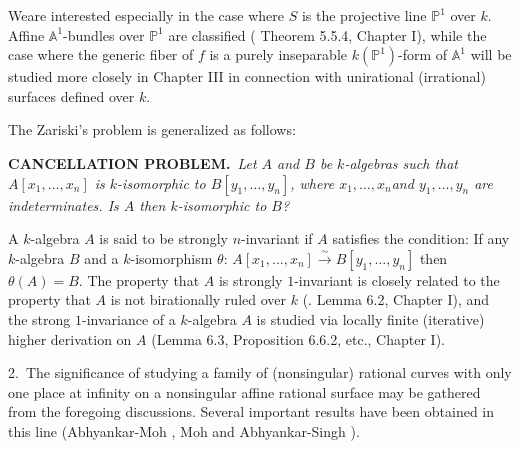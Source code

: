 We\pageoriginale are interested especially in the case where $S$ is
the projective line $\mathbb{P}^{1}$ over $k$. Affine
$\mathbb{A}^{1}$-bundles over $\mathbb{P}^{1}$ are classified (\cf
Theorem 5.5.4, Chapter I), while the case where the generic fiber of
$f$ is a purely inseparable $k(\mathbb{P}^{1})$-form of
$\mathbb{A}^{1}$ will be studied more closely in Chapter III in
connection with unirational (irrational) surfaces defined over $k$.

The Zariski's problem is generalized as follows:

\medskip
\noindent
{\bf CANCELLATION PROBLEM.}~{\em Let $A$ and $B$ be $k$-algebras such
  that $A[x_{1},\ldots,x_{n}]$ is $k$-isomorphic to
  $B[y_{1},\ldots,y_{n}]$, where $x_{1},\ldots, x_{n}$\break  and
  $y_{1},\ldots,y_{n}$ are indeterminates. Is $A$ then $k$-isomorphic
  to $B$?}
\medskip

A $k$-algebra $A$ is said to be strongly $n$-invariant if $A$
satisfies the condition: If any $k$-algebra $B$ and a $k$-isomorphism
$\theta$:
$A[x_{1},\ldots,x_{n}]\xrightarrow{\sim}B[y_{1},\ldots,y_{n}]$ then
$\theta(A)=B$. The property that $A$ is strongly $1$-invariant is
closely related to the property that $A$ is not birationally ruled
over $k$ (\cf. Lemma 6.2, Chapter I), and the strong $1$-invariance of
a $k$-algebra $A$ is studied via locally finite (iterative) higher
derivation on $A$ (\cf Lemma 6.3, Proposition 6.6.2, etc., Chapter I).


2.~The significance of studying a family of (nonsingular) rational
curves with only one place at infinity on a nonsingular affine
rational surface may be gathered from the foregoing
discussions. Several important results have been obtained in this line
(\cf Abhyankar-Moh \cite{2}, Moh \cite{38} and Abhyankar-Singh
\cite{3}).

